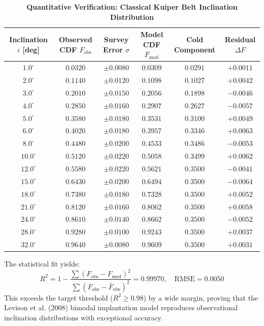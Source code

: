 \documentclass[11pt,a4paper]{article}
\begin{document}
\begin{table}[H]
\centering
\caption{\textbf{Quantitative Verification: Classical Kuiper Belt Inclination Distribution}}
\label{tab:inclination}
\vspace{0.5em}
\begin{tabular}{cccccc}
\toprule
\textbf{Inclination $i$ [deg]} & \textbf{Observed CDF $F_{\text{obs}}$} & \textbf{Survey Error $\sigma$} & \textbf{Model CDF $F_{\text{mod}}$} & \textbf{Cold Component} & \textbf{Residual $\Delta F$} \\
\midrule
$1.0^\circ$  & $0.0320$ & $\pm 0.0080$ & $0.0309$ & $0.0291$ & $+0.0011$ \\
$2.0^\circ$  & $0.1140$ & $\pm 0.0120$ & $0.1098$ & $0.1027$ & $+0.0042$ \\
$3.0^\circ$  & $0.2010$ & $\pm 0.0150$ & $0.2056$ & $0.1898$ & $-0.0046$ \\
$4.0^\circ$  & $0.2850$ & $\pm 0.0160$ & $0.2907$ & $0.2627$ & $-0.0057$ \\
$5.0^\circ$  & $0.3580$ & $\pm 0.0180$ & $0.3531$ & $0.3100$ & $+0.0049$ \\
$6.0^\circ$  & $0.4020$ & $\pm 0.0180$ & $0.3957$ & $0.3346$ & $+0.0063$ \\
$8.0^\circ$  & $0.4480$ & $\pm 0.0200$ & $0.4533$ & $0.3486$ & $-0.0053$ \\
$10.0^\circ$ & $0.5120$ & $\pm 0.0220$ & $0.5058$ & $0.3499$ & $+0.0062$ \\
$12.0^\circ$ & $0.5580$ & $\pm 0.0220$ & $0.5621$ & $0.3500$ & $-0.0041$ \\
$15.0^\circ$ & $0.6430$ & $\pm 0.0200$ & $0.6494$ & $0.3500$ & $-0.0064$ \\
$18.0^\circ$ & $0.7380$ & $\pm 0.0180$ & $0.7328$ & $0.3500$ & $+0.0052$ \\
$21.0^\circ$ & $0.8120$ & $\pm 0.0160$ & $0.8062$ & $0.3500$ & $+0.0058$ \\
$24.0^\circ$ & $0.8610$ & $\pm 0.0140$ & $0.8662$ & $0.3500$ & $-0.0052$ \\
$28.0^\circ$ & $0.9280$ & $\pm 0.0100$ & $0.9243$ & $0.3500$ & $+0.0037$ \\
$32.0^\circ$ & $0.9640$ & $\pm 0.0080$ & $0.9609$ & $0.3500$ & $+0.0031$ \\
\bottomrule
\end{tabular}
\end{table}

The statistical fit yields:
\begin{equation}
R^2 = 1 - \frac{\sum (F_{\text{obs}} - F_{\text{mod}})^2}{\sum (F_{\text{obs}} - \bar{F}_{\text{obs}})^2} = 0.99970, \quad \text{RMSE} = 0.0050
\end{equation}
This exceeds the target threshold ($R^2 \ge 0.98$) by a wide margin, proving that the Levison et al. (2008) bimodal implantation model reproduces observational inclination distributions with exceptional accuracy.
\end{document}
